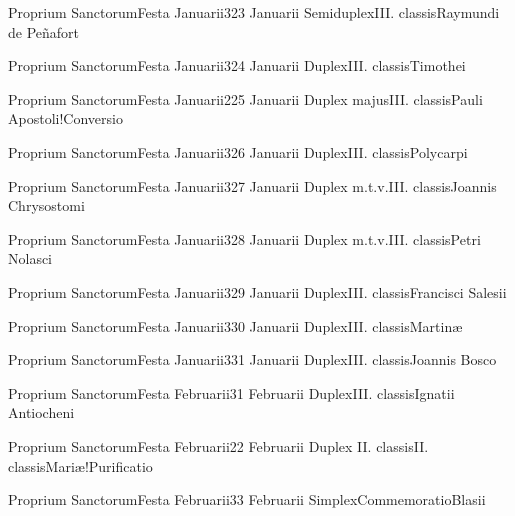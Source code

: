 \documentclass[psalterium-feriale.tex]{subfiles}
\begin{document}
	{Proprium Sanctorum}{Festa Januarii}{3}{23 Januarii}
	{Semiduplex}{III. classis}{Raymundi de Peñafort}
	{}
	{}
\COPOaRubric

	{Proprium Sanctorum}{Festa Januarii}{3}{24 Januarii}
	{Duplex}{III. classis}{Timothei}
	{}
	{}
\UMEXbRubric

	{Proprium Sanctorum}{Festa Januarii}{2}{25 Januarii}
	{Duplex majus}{III. classis}{Pauli Apostoli!Conversio}
	{}
	{}
\psalmodiapropria

	{Proprium Sanctorum}{Festa Januarii}{3}{26 Januarii}
	{Duplex}{III. classis}{Polycarpi}
	{}
	{}
\UMEXbRubric

	{Proprium Sanctorum}{Festa Januarii}{3}{27 Januarii}
	{Duplex m.t.v.}{III. classis}{Joannis Chrysostomi}
	{}
	{}
\COPOcRubric

	{Proprium Sanctorum}{Festa Januarii}{3}{28 Januarii}
	{Duplex m.t.v.}{III. classis}{Petri Nolasci}
	{}
	{}
\COPObRubric

	{Proprium Sanctorum}{Festa Januarii}{3}{29 Januarii}
	{Duplex}{III. classis}{Francisci Salesii}
	{}
	{}
\COPOcRubric

	{Proprium Sanctorum}{Festa Januarii}{3}{30 Januarii}
	{Duplex}{III. classis}{Martinæ}
	{}
	{}

	{Proprium Sanctorum}{Festa Januarii}{3}{31 Januarii}
	{Duplex}{III. classis}{Joannis Bosco}
	{}
	{}
\COPObRubric

	{Proprium Sanctorum}{Festa Februarii}{3}{1 Februarii}
	{Duplex}{III. classis}{Ignatii Antiocheni}
	{}
	{}
\UMEXbRubric

	{Proprium Sanctorum}{Festa Februarii}{2}{2 Februarii}
	{Duplex II. classis}{II. classis}{Mariæ!Purificatio}
	{}
	{}
\psalmodiapropria

	{Proprium Sanctorum}{Festa Februarii}{3}{3 Februarii}
	{Simplex}{Commemoratio}{Blasii}
	{}
	{}
\UMEXaRubric
\end{document}
